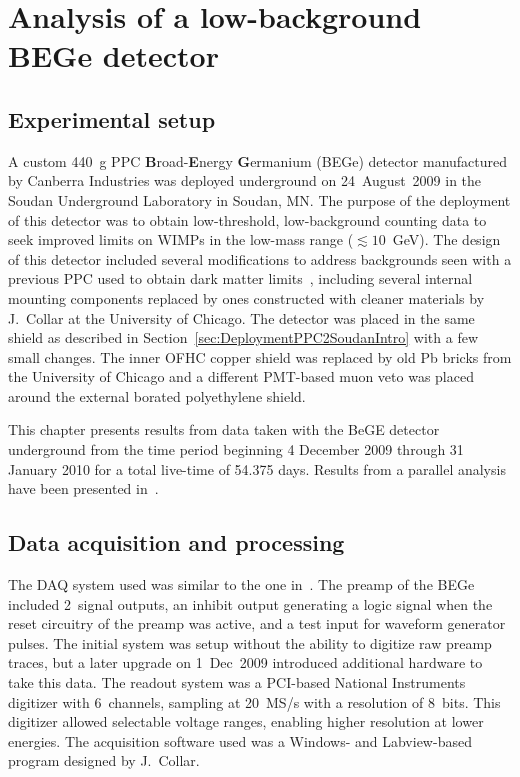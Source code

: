
\chapter{Analysis of a low-background BEGe detector}
\label{chap:AnalysisBeGe}
	\section{Experimental setup}
	\label{sec:BeGeExperimentalSetup}

A custom 440~g PPC \textbf{B}road-\textbf{E}nergy \textbf{G}ermanium (BEGe) detector manufactured by Canberra Industries was deployed underground on 24~August~2009 in the Soudan Underground Laboratory in Soudan, MN.  The purpose of the deployment of this detector was to obtain low-threshold, low-background counting data to seek improved limits on WIMPs in the low-mass range ($\lesssim10$~GeV).  The design of this detector included several modifications to address backgrounds seen with a previous PPC used to obtain dark matter limits~\cite{Aalseth:2008aa}, including several internal mounting components replaced by ones constructed with cleaner materials by J.~Collar at the University of Chicago.  The detector was placed in the same shield as described in Section~\ref{sec:DeploymentPPC2SoudanIntro} with a few small changes.  The inner OFHC copper shield was replaced by old Pb bricks from the University of Chicago and a different PMT-based muon veto was placed around the external borated polyethylene shield.  %

This chapter presents results from data taken with the BeGE detector underground from the time period beginning 4 December 2009 through 31 January 2010 for a total live-time of 54.375 days.  Results from a parallel analysis have been presented in~\cite{Aalseth:2010aa}.

	\section{Data acquisition and processing}
	\label{sec:BeGeDAQProcessing}
	
The DAQ system used was similar to the one in~\cite{Aalseth:2008aa}.  The preamp of the BEGe included 2~signal outputs, an inhibit output generating a logic signal when the reset circuitry of the preamp was active, and a test input for waveform generator pulses.  The initial system was setup without the ability to digitize raw preamp traces, but a later upgrade on 1~Dec~2009 introduced additional hardware to take this data.  The readout system was a PCI-based National Instruments digitizer with 6~channels, sampling at 20~MS/s with a resolution of 8~bits.  This digitizer allowed selectable voltage ranges, enabling higher resolution at lower energies.  The acquisition software used was a Windows- and Labview-based program designed by J.~Collar.  

